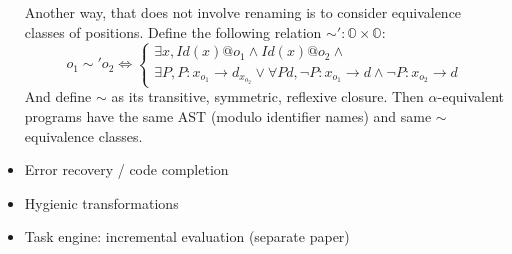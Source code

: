\begin{itemize}
Another way, that does not involve renaming is to consider equivalence classes of positions. Define the following relation $\sim' : \mathbb{O} \times \mathbb{O}$:
$$ o_1 \sim' o_2 \Leftrightarrow
\left\{ 
  \begin{array}{l}
\exists x, Id(x)@ o_1 \wedge Id(x)@ o_2 \wedge \\
\exists P, P : x_{o_1} \rightarrow d_{x_{o_2}} \vee 
\forall P d, \neg P : x_{o_1} \rightarrow d \wedge \neg P : x_{o_2} \rightarrow d   
  \end{array}\right.$$
And define $\sim$ as its transitive, symmetric, reflexive closure.
Then $\alpha$-equivalent programs have the same AST (modulo identifier names) and same $\sim$ equivalence classes. 

\item
  Error recovery / code completion
\item
  Hygienic transformations
\item
  Task engine: incremental evaluation (separate paper)
\end{itemize}


